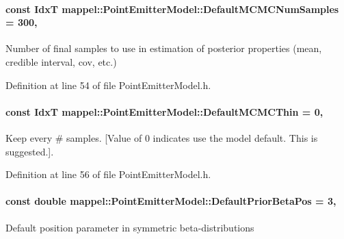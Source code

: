\paragraph[{\texorpdfstring{Default\+M\+C\+M\+C\+Num\+Samples}{DefaultMCMCNumSamples}}]{\setlength{\rightskip}{0pt plus 5cm}const {\bf IdxT} mappel\+::\+Point\+Emitter\+Model\+::\+Default\+M\+C\+M\+C\+Num\+Samples = 300\hspace{0.3cm}{\ttfamily [static]}, {\ttfamily [inherited]}}\hypertarget{classmappel_1_1PointEmitterModel_a9bbed2f2e91f1e5f0f4f9389cd2de333}{}\label{classmappel_1_1PointEmitterModel_a9bbed2f2e91f1e5f0f4f9389cd2de333}


Number of final samples to use in estimation of posterior properties (mean, credible interval, cov, etc.) 



Definition at line 54 of file Point\+Emitter\+Model.\+h.

\paragraph[{\texorpdfstring{Default\+M\+C\+M\+C\+Thin}{DefaultMCMCThin}}]{\setlength{\rightskip}{0pt plus 5cm}const {\bf IdxT} mappel\+::\+Point\+Emitter\+Model\+::\+Default\+M\+C\+M\+C\+Thin = 0\hspace{0.3cm}{\ttfamily [static]}, {\ttfamily [inherited]}}\hypertarget{classmappel_1_1PointEmitterModel_aac243ab7c6862c3d9ce3af8ca8a17e6c}{}\label{classmappel_1_1PointEmitterModel_aac243ab7c6862c3d9ce3af8ca8a17e6c}


Keep every \# samples. \mbox{[}Value of 0 indicates use the model default. This is suggested.\mbox{]}. 



Definition at line 56 of file Point\+Emitter\+Model.\+h.

\paragraph[{\texorpdfstring{Default\+Prior\+Beta\+Pos}{DefaultPriorBetaPos}}]{\setlength{\rightskip}{0pt plus 5cm}const double mappel\+::\+Point\+Emitter\+Model\+::\+Default\+Prior\+Beta\+Pos = 3\hspace{0.3cm}{\ttfamily [static]}, {\ttfamily [inherited]}}\hypertarget{classmappel_1_1PointEmitterModel_a2771dc4415f351862619cd9671b5310d}{}\label{classmappel_1_1PointEmitterModel_a2771dc4415f351862619cd9671b5310d}
Default position parameter in symmetric beta-\/distributions 

